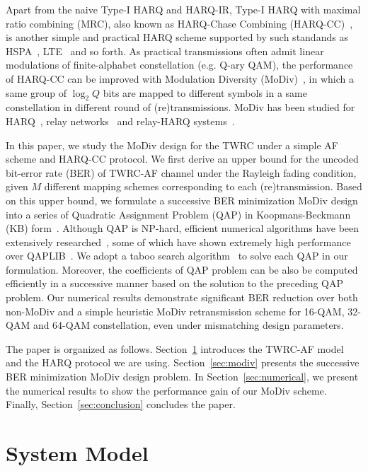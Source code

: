 \documentclass{article}
\begin{document}
Apart from the naive Type-I HARQ and HARQ-IR, Type-I HARQ with maximal ratio
combining (MRC), also known as HARQ-Chase Combining
(HARQ-CC)~\cite{chase1985code}, is another simple and practical HARQ
scheme supported by such standands as HSPA~\cite{TS25.308},
LTE~\cite{sesia2009lte} and so forth. As practical transmissions often admit
linear modulations of finite-alphabet constellation (e.g. Q-ary QAM), the
performance of HARQ-CC can be improved with Modulation Diversity
(MoDiv)~\cite{benelli1992new}, in which a same group of $\log_2Q$ bits are
mapped to different symbols in a same constellation in different round of
(re)transmissions. MoDiv has been studied for
HARQ~\cite{harvind2005symbol}, relay
networks~\cite{seddik2008trans, khormuji2008rate} and relay-HARQ
systems~\cite{kim2009design, ryu2011ber}.

In this paper, we study the MoDiv design for the TWRC under a simple AF scheme
and HARQ-CC protocol. We first derive an upper bound for the uncoded bit-error
rate (BER) of TWRC-AF channel under the Rayleigh fading condition, given $M$
different mapping schemes corresponding to each (re)transmission. Based on this
upper bound, we formulate a successive BER minimization MoDiv design into a
series of Quadratic Assignment Problem (QAP) in Koopmans-Beckmann (KB)
form~\cite{koopmans1957assignment}. Although QAP is NP-hard, efficient numerical
algorithms have been extensively researched~\cite{benlic2015memetic}, some of
which have shown extremely high performance over
QAPLIB~\cite{burkard1997qaplib}. We adopt a taboo search
algorithm~\cite{taillard1991robust} to solve each QAP in our formulation. Moreover, the coefficients of QAP problem can be also be computed efficiently in a
successive manner based on the solution to the preceding QAP problem. Our
numerical results demonstrate significant BER reduction over both non-MoDiv and
a simple heuristic MoDiv retransmission scheme for 16-QAM, 32-QAM and 64-QAM
constellation, even under mismatching design parameters.

The paper is organized as follows. Section~\ref{sec:model} introduces the
TWRC-AF model and the HARQ protocol we are using. Section~\ref{sec:modiv}
presents the successive BER minimization MoDiv design problem. In
Section~\ref{sec:numerical}, we present the numerical results to show the
performance gain of our MoDiv scheme. Finally, Section~\ref{sec:conclusion}
concludes the paper.

\section{System Model}
\label{sec:model}
\end{document}
